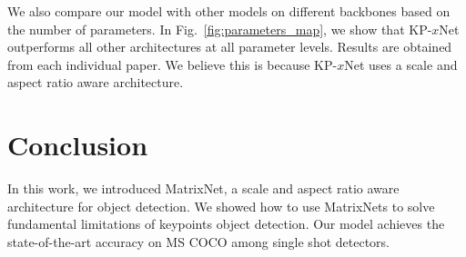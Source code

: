 \documentclass[10pt,twocolumn,letterpaper]{article}
\begin{document}
We also compare our model with other models on different backbones based on the number of parameters. In Fig.~\ref{fig:parameters_map}, we show that KP-$x$Net outperforms all other architectures at all parameter levels. Results are obtained from each individual paper. We believe this is because KP-$x$Net uses a scale and aspect ratio aware architecture.  
\vspace{-0.25cm}
\section{Conclusion}
\vspace{-0.15cm}
In this work, we introduced MatrixNet, a scale and aspect ratio aware architecture for object detection. We showed how to use MatrixNets to solve fundamental limitations of keypoints object detection. Our model achieves the state-of-the-art accuracy on MS COCO among single shot detectors.
\vspace{-0.25cm}
{\small


}
\end{document}

